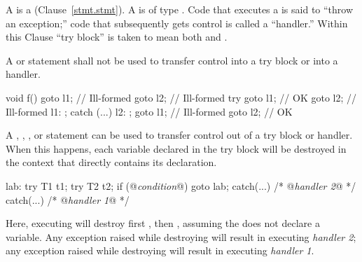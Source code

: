 \pnum
{}%
%
%
%
A  is a  (Clause~\ref{stmt.stmt}).
A  is of type . Code that executes a
 is said to ``throw an exception;'' code that
subsequently gets control is called a ``handler.'' \enternote Within this Clause
``try block'' is taken to mean both  and
. \exitnote

\pnum
{}%
%
%
%
%
%
A  or  statement shall not be used to transfer control
into a try block or into a handler.
\enterexample
\begin{codeblock}
void f() {
  goto l1;          // Ill-formed
  goto l2;          // Ill-formed
  try {
    goto l1;        // OK
    goto l2;        // Ill-formed
    l1: ;
  } catch (...) {
    l2: ;
    goto l1;        // Ill-formed
    goto l2;        // OK
  }
}

\end{codeblock}
\exitexample
{}%
%
%
%
%
%
%
%
A
,
,
,
or
statement can be used to transfer control out of
a try block or handler.
When this happens, each variable declared in the try block
will be destroyed in the context that
directly contains its declaration.
\enterexample

\begin{codeblock}
lab:  try {
  T1 t1;
  try {
    T2 t2;
    if (@\textit{condition}@)
      goto lab;
    } catch(...) { /* @\textit{handler 2}@ */ }
  } catch(...) { /* @\textit{handler 1}@ */ }
\end{codeblock}

Here, executing
will destroy first
,
then
,
assuming the
does not declare a variable.
Any exception raised while destroying
will result in executing
\textit{handler 2};
any exception raised while destroying
will result in executing
\textit{handler 1}.
\exitexample

